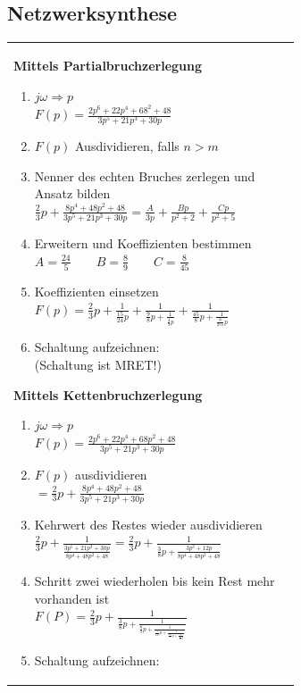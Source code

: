 \subsection{Netzwerksynthese}
	\begin{tabular}{ll}
    	\parbox{9cm}{
			\textbf{Mittels Partialbruchzerlegung}
				\begin{enumerate}{\setlength{\itemsep}{0cm}\setlength{\parsep}{0cm} \setlength{\topsep}{0cm}}
		          \item $j\omega \Rightarrow p$\\
		          $F(p)=\frac{2p^6+22p^4+68^2+48}{3p^5+21p^3+30p}$
		          \item $F(p)$ Ausdividieren, falls $n>m$
		          \item Nenner des echten Bruches zerlegen und \\
		          Ansatz bilden\\
		          $\frac{2}{3}p+\frac{8p^4+48p^2+48}{3p^5+21p^3+30p}=\frac{A}{3p}+\frac{Bp}{p^2+2}+\frac{Cp}{p^2+5}$
		          \item Erweitern und Koeffizienten bestimmen\\
		          $A=\frac{24}{5} \qquad B=\frac{8}{9} \qquad C=\frac{8}{45}$
		          \item Koeffizienten einsetzen\\
		          $F(p)=\frac{2}{3}p+\frac{1}{\frac{15}{24}p}+\frac{1}{\frac{9}{8}p+\frac{1}{\frac{4}{9}p}}+\frac{1}{\frac{45}{8}p+\frac{1}{\frac{8}{255}p}}$
		          \item Schaltung aufzeichnen:\\
		          (Schaltung ist MRET!)
                \end{enumerate}
        }
    	\parbox{9cm}{
			\textbf{Mittels Kettenbruchzerlegung}
				\begin{enumerate}{\setlength{\itemsep}{0cm}\setlength{\parsep}{0cm} \setlength{\topsep}{0cm}}
                  \item $j\omega \Rightarrow p$\\
                  $F(p)=\frac{2p^6+22p^4+68p^2+48}{3p^5+21p^3+30p}$
		          \item $F(p)$ ausdividieren\\
		          $=\frac{2}{3}p+\frac{8p^4+48p^2+48}{3p^5+21p^3+30p}$
		          \item Kehrwert des Restes wieder ausdividieren\\
		          $\frac{2}{3}p+\frac{1}{\frac{3p^5+21p^3+30p}{8p^4+48p^2+48}}=\frac{2}{3}p+\frac{1}{\frac{3}{8}p+\frac{3p^3+12p}{8p^4+48p^2+48}}$
		          \item Schritt zwei wiederholen bis kein Rest mehr\\
		          vorhanden ist\\
		          $F(P)=\frac{2}{3}p+\frac{1}{\frac{3}{8}p+\frac{1}{\frac{8}{3}p+\frac{1}{\frac{3}{16}p+\frac{1}{\frac{16}{3}p+\frac{1}{\frac{1}{16}p}}}}}$
		          \item Schaltung aufzeichnen:
                \end{enumerate}
         }
	\end{tabular}\\

